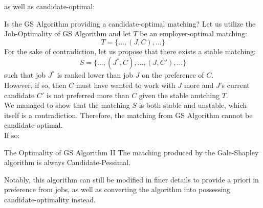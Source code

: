 as well as candidate-optimal:
\begin{ln-think}{Is the GS Algorithm providing a candidate-optimal matching?}{}
    Let us utilize the Job-Optimality of GS Algorithm and let $T$ be an employer-optimal matching:
    \[T = \{\dots, (J, C), \dots\}\]
    For the sake of contradiction, let us propose that there exists a stable matching:
    \[S = \{\dots, (J^*, C), \dots, (J, C'), \dots\}\]
    such that job $J^*$ is ranked lower than job $J$ on the preference of $C$. \\
    However, if so, then $C$ must have wanted to work with $J$ more and $J$'s current candidate $C'$ is not preferred more than $C$ given the stable amtching $T$. \\
    We managed to show that the matching $S$ is both stable and unstable, which itself is a contradiction. Therefore, the matching from GS Algorithm cannot be candidate-optimal. \\
    If so:
    \begin{ln-theorem}{The Optimality of GS Algorithm II}{}
        The matching produced by the Gale-Shapley algorithm is always Candidate-Pessimal.
    \end{ln-theorem}
\end{ln-think}
Notably, this algorithm can still be modified in finer details to provide a priori in preference from jobs, as well as converting the algorithm into possessing candidate-optimality instead.
